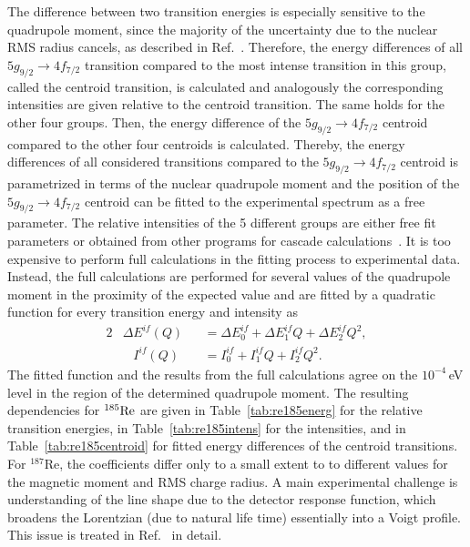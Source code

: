 The difference between two transition energies is especially sensitive to the quadrupole moment, since the majority of the uncertainty due to the nuclear RMS radius cancels, as described in Ref.~\cite{konijn1979}. Therefore, the energy differences of all $5g_{9/2}\rightarrow4f_{7/2}$ transition compared to the most intense transition in this group, called the centroid transition, is calculated and analogously the corresponding intensities are given relative to the centroid transition.
The same holds for the other four groups. Then, the energy difference of the $5g_{9/2}\rightarrow4f_{7/2}$ centroid compared to the other four centroids is calculated.
Thereby, the energy differences of all considered transitions compared to the $5g_{9/2}\rightarrow4f_{7/2}$ centroid is parametrized in terms of the nuclear quadrupole moment and the position of the $5g_{9/2}\rightarrow4f_{7/2}$ centroid can be fitted to the experimental spectrum as a free parameter. The relative intensities of the 5 different groups are either free fit parameters or obtained from other programs for cascade calculations~\cite{elisa_privcomm}.
It is too expensive to perform full calculations in the fitting process to experimental data. Instead, the full calculations are performed for several values of the quadrupole moment in the proximity of the expected value and are fitted by a quadratic function for every transition energy and intensity as
\begin{alignat}{2}
&\Delta E^{if}(Q)&&= \Delta E^{if}_0 +  \Delta E^{if}_1 Q+  \Delta E^{if}_2 Q^2,\label{eq:en_fit}\\
&\phantom{\Delta}I^{if}(Q)&&= I^{if}_0 +  I^{if}_1 Q+  I^{if}_2 Q^2.\label{eq:tran_fit}
\end{alignat}
The fitted function and the results from the full calculations agree on the $10^{-4}\,$eV level in the region of the determined quadrupole moment. The resulting dependencies for $^{185}\rm{Re}$ are given in Table~\ref{tab:re185energ} for the relative transition energies, in Table~\ref{tab:re185intens} for the intensities, and in Table~\ref{tab:re185centroid} for fitted energy differences of the centroid transitions. For $^{187}$Re, the coefficients differ only to a small extent to to different values for the magnetic moment and RMS charge radius.
A main experimental challenge is understanding of the line shape due to the detector response function, which broadens the Lorentzian (due to natural life time) essentially into a Voigt profile. This issue is treated in Ref.~\cite{vogiatzi2018} in detail.

